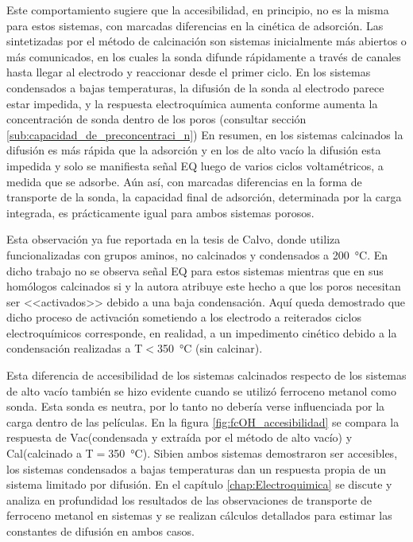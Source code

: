       Este comportamiento sugiere que la accesibilidad, en principio, no es la misma para estos sistemas, con marcadas diferencias en la cinética de adsorción. Las \pdmF\space sintetizadas por el método de calcinación son sistemas inicialmente más abiertos o más comunicados, en los cuales la sonda difunde rápidamente a través de canales hasta llegar al electrodo y reaccionar desde el primer ciclo. En los sistemas condensados a bajas temperaturas, la difusión de la sonda al electrodo parece estar impedida, y la respuesta electroquímica aumenta conforme aumenta la concentración de sonda dentro de los poros (consultar sección \ref{sub:capacidad_de_preconcentraci_n}) En resumen, en los sistemas calcinados la difusión es más rápida que la adsorción y en los de alto vacío la difusión esta impedida y solo se manifiesta señal EQ luego de varios ciclos voltamétricos, a medida que se adsorbe. Aún así, con marcadas diferencias en la forma de transporte de la sonda, la capacidad final de adsorción, determinada por la carga integrada, es prácticamente igual para ambos sistemas porosos.

      Esta observación ya fue reportada en la tesis de Calvo\cite{Calvo20210}, donde utiliza \pdmF\space funcionalizadas con grupos aminos, no calcinados y condensados a \SI{200}{\celsius}. En dicho trabajo no se observa señal EQ para estos sistemas mientras que en sus homólogos calcinados si y la autora atribuye este hecho a que los poros necesitan ser <<activados>> debido a una baja condensación. Aquí queda demostrado que dicho proceso de activación sometiendo a los electrodo a reiterados ciclos electroquímicos corresponde, en realidad, a un impedimento cinético debido a la condensación realizadas a T$<$\SI{350}{\celsius} (sin calcinar).

      Esta diferencia de accesibilidad de los sistemas calcinados respecto de los sistemas de alto vacío también se hizo evidente cuando se utilizó ferroceno metanol como sonda. Esta sonda es neutra, por lo tanto no debería verse influenciada por la carga dentro de las películas. En la figura \ref{fig:fcOH_accesibilidad} se compara la respuesta de Vac\pdmF\space (condensada y extraída por el método de alto vacío) y Cal\pdmF\space (calcinado a T$=$\SI{350}{\celsius}). Si\space bien ambos sistemas demostraron ser accesibles, los sistemas condensados a bajas temperaturas dan un respuesta propia de un sistema limitado por difusión. En el capítulo \ref{chap:Electroquimica} se discute y analiza en profundidad los resultados de las observaciones de transporte de ferroceno metanol en sistemas \pdmF\space y se realizan cálculos detallados para estimar las constantes de difusión en ambos casos.

